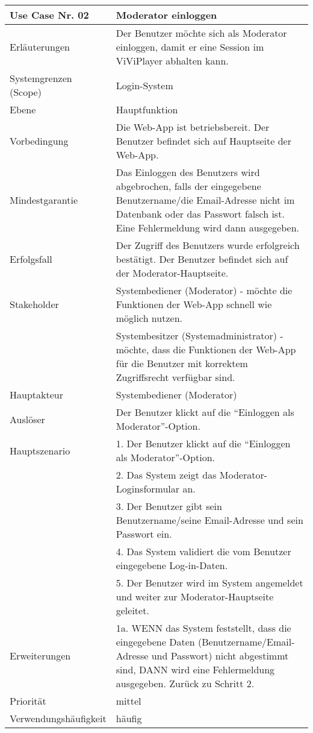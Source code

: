 \begin{tabularx}{\linewidth}{|l|X|}
	\hline
	Use Case Nr. 02			& \textbf{Moderator einloggen} \\ \hline
	Erläuterungen			& Der Benutzer möchte sich als Moderator einloggen, damit er eine 
							  Session im ViViPlayer abhalten kann. \\ \hline
	Systemgrenzen (Scope)	& Login-System \\ \hline
	Ebene					& Hauptfunktion \\ \hline
	Vorbedingung			& Die Web-App ist betriebsbereit. Der Benutzer befindet sich auf
							  Hauptseite der Web-App. \\ \hline
	Mindestgarantie			& Das Einloggen des Benutzers wird abgebrochen, falls der eingegebene
							  Benutzername/die Email-Adresse nicht im Datenbank oder das Passwort falsch ist. Eine Fehlermeldung wird dann ausgegeben.
							  \\ \hline
	Erfolgsfall 			& Der Zugriff des Benutzers wurde erfolgreich bestätigt. Der
							  Benutzer befindet sich auf der Moderator-Hauptseite. 
							  \\ \hline
	Stakeholder				& Systembediener (Moderator) - möchte die Funktionen der Web-App 
							  schnell wie möglich nutzen. \\
							& Systembesitzer (Systemadministrator) - möchte, dass die Funktionen 
							  der Web-App für die Benutzer mit korrektem Zugriffsrecht verfügbar sind.\\ \hline
	Hauptakteur				& Systembediener (Moderator) \\ \hline
	Auslöser				& Der Benutzer klickt auf die ``Einloggen als Moderator''-Option.\\ 
							  \hline	
	Hauptszenario			& 1. Der Benutzer klickt auf die ``Einloggen als 
							  Moderator''-Option.\\
							& 2. Das System zeigt das Moderator-Loginsformular an. \\
							& 3. Der Benutzer gibt sein Benutzername/seine Email-Adresse und 
							  sein Passwort ein. \\
							& 4. Das System validiert die vom Benutzer eingegebene
							  Log-in-Daten. \\
							& 5. Der Benutzer wird im System angemeldet und weiter zur
							  Moderator-Hauptseite geleitet. \\ \hline
	Erweiterungen			& 1a. WENN das System feststellt, dass die eingegebene Daten 
							  (Benutzername/Email-Adresse und Passwort) nicht abgestimmt sind, DANN wird eine Fehlermeldung ausgegeben. Zurück zu Schritt 2. \\ \hline
	Priorität				& mittel \\ \hline
	Verwendungshäufigkeit	& häufig \\ \hline
\end{tabularx}
